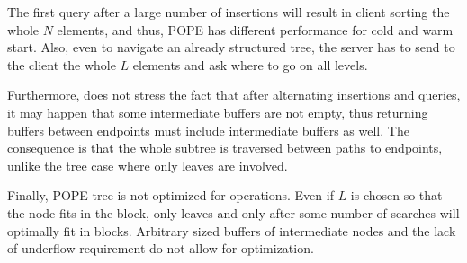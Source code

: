 		The first query after a large number of insertions will result in client sorting the whole $N$ elements, and thus, POPE has different performance for cold and warm start.
		Also, even to navigate an already structured tree, the server has to send to the client the whole $L$ elements and ask where to go on all levels.

		Furthermore, \cite{pope} does not stress the fact that after alternating insertions and queries, it may happen that some intermediate buffers are not empty, thus returning buffers between endpoints must include intermediate buffers as well. %
		The consequence is that the whole subtree is traversed between paths to endpoints, unlike the {\BPlus} tree case where only leaves are involved.

		Finally, POPE tree is not optimized for {\IO} operations.
		Even if $L$ is chosen so that the node fits in the block, only leaves and only after some number of searches will optimally fit in blocks.
		Arbitrary sized buffers of intermediate nodes and the lack of underflow requirement do not allow for {\IO} optimization.
